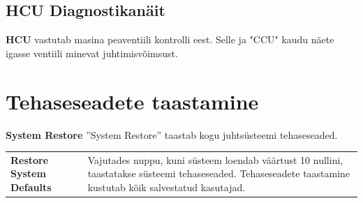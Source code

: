 \documentclass[12pt,a4paper,english]{uvmanual}
\begin{document}
\FloatBarrier
\subsection{HCU Diagnostikanäit}\label{ch:system_diagnostics_ecu}


\textbf{HCU} vastutab masina peaventiili kontrolli eest. Selle ja "CCU" kaudu näete igasse ventiili minevat juhtimisvõimsust.



\section{Tehaseseadete taastamine}\label{ch:system_restore}

\textbf{System Restore} ''System Restore'' taastab kogu juhtsüsteemi tehaseseaded.


\begin{tabular}{ L{0.2\textwidth} L{0.66\textwidth} }
\textbf{Restore System Defaults} & Vajutades nuppu, kuni süsteem loendab väärtust 10 nullini, taastatakse süsteemi tehaseseaded. Tehaseseadete taastamine kustutab kõik salvestatud kasutajad.  \\
\end{tabular}
\end{document}
